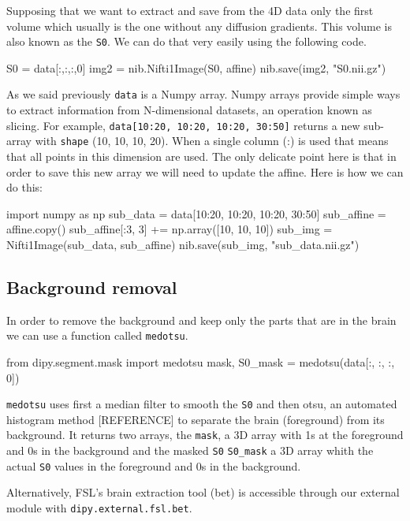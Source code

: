 \documentclass{bioinfo}
\begin{document}
Supposing that we want to extract and save from the 4D data only the first volume which usually is the one without any diffusion gradients. This volume is also known as the \texttt{S0}. We can do that very easily using the following code.
\begin{python}
S0 = data[:,:,:,0]
img2 = nib.Nifti1Image(S0, affine)
nib.save(img2, "S0.nii.gz")
\end{python}
As we said previously \texttt{data} is a Numpy array. Numpy arrays provide simple ways to extract information from N-dimensional datasets, an operation known as slicing. For example, \texttt{data[10:20, 10:20, 10:20, 30:50]} returns a new sub-array with \texttt{shape} (10, 10, 10, 20). When a single column (:) is used that means that all points in this dimension are used. The only delicate point here is that in order to save this new array we will need to update the affine. Here is how we can do this:
\begin{python}
import numpy as np
sub_data = data[10:20, 10:20, 10:20, 30:50]
sub_affine = affine.copy()
sub_affine[:3, 3] += np.array([10, 10, 10])
sub_img = Nifti1Image(sub_data, sub_affine)
nib.save(sub_img, "sub_data.nii.gz")
\end{python}

\subsection{Background removal}
In order to remove the background and keep only the parts that are in the brain we can use a function called \texttt{medotsu}.
\begin{python}
from dipy.segment.mask import medotsu
mask, S0_mask = medotsu(data[:, :, :, 0])
\end{python}
\texttt{medotsu} uses first a median filter to smooth the \texttt{S0} and then otsu, an automated histogram method [REFERENCE] to separate the brain (foreground) from its background. It returns two arrays, the \texttt{mask}, a 3D array with 1s at the foreground and 0s in the background and the masked \texttt{S0} \texttt{S0\_mask} a 3D array whith the actual \texttt{S0} values in the foreground and 0s in the background.

Alternatively, FSL's brain extraction tool (bet) is accessible through our external module with \texttt{dipy.external.fsl.bet}.
\end{document}
